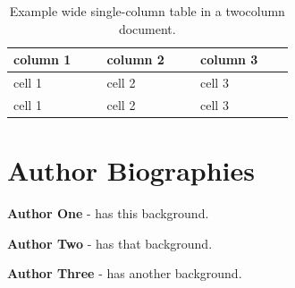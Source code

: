 \documentclass{psig_required_latex_files/psig}
\begin{document}
\begin{table}[ht]
\caption{Example wide single-column table in a twocolumn document.}
\centering
\begin{tabular}{p{0.25\linewidth}p{0.25\linewidth}p{0.25\linewidth}}
\hline
column 1 & column 2 & column 3\\
\hline
cell 1 & cell 2 & cell 3\\
cell 1 & cell 2 & cell 3\\
\hline
\end{tabular}
\end{table}


\section*{Author Biographies}

\textbf{Author One} - has this background.

\noindent
\textbf{Author Two} - has that background.

\noindent
\textbf{Author Three} - has another background.

\end{document}
